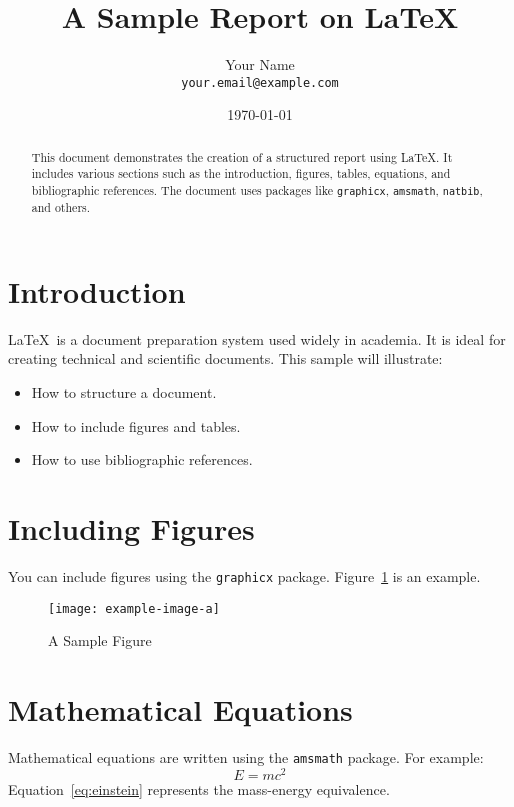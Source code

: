 \documentclass[12pt,a4paper]{article} %
\title{A Sample Report on LaTeX}
\author{Your Name \\ \texttt{your.email@example.com}}
\date{\today} %
\begin{document}
\maketitle
\thispagestyle{empty} %

\begin{abstract}
This document demonstrates the creation of a structured report using \LaTeX. It includes various sections such as the introduction, figures, tables, equations, and bibliographic references. The document uses packages like \texttt{graphicx}, \texttt{amsmath}, \texttt{natbib}, and others.
\end{abstract}

\tableofcontents
\newpage %

\section{Introduction}
\LaTeX~is a document preparation system used widely in academia. It is ideal for creating technical and scientific documents. This sample will illustrate:
\begin{itemize}
    \item How to structure a document.
    \item How to include figures and tables.
    \item How to use bibliographic references.
\end{itemize}

\section{Including Figures}
You can include figures using the \texttt{graphicx} package. Figure~\ref{fig:sample} is an example.

\begin{figure}[h]
    \centering
    \texttt{[image: example-image-a]} %
    \caption{A Sample Figure}
    \label{fig:sample}
\end{figure}

\section{Mathematical Equations}
Mathematical equations are written using the \texttt{amsmath} package. For example:
\begin{equation}
    E = mc^2
    \label{eq:einstein}
\end{equation}
Equation~\ref{eq:einstein} represents the mass-energy equivalence.
\end{document}
